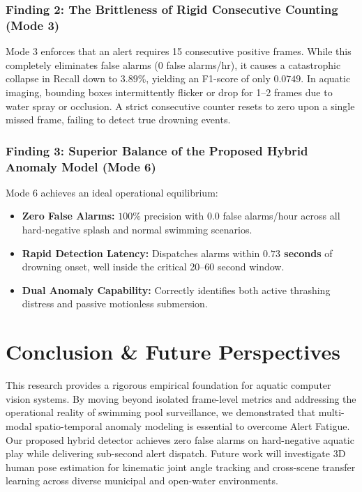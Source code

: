 \documentclass[a4paper,11pt]{article}
\begin{document}
\subsubsection{Finding 2: The Brittleness of Rigid Consecutive Counting (Mode 3)}
Mode 3 enforces that an alert requires 15 consecutive positive frames. While this completely eliminates false alarms (0 false alarms/hr), it causes a catastrophic collapse in Recall down to \textbf{$3.89\%$}, yielding an F1-score of only $0.0749$. In aquatic imaging, bounding boxes intermittently flicker or drop for 1--2 frames due to water spray or occlusion. A strict consecutive counter resets to zero upon a single missed frame, failing to detect true drowning events.

\subsubsection{Finding 3: Superior Balance of the Proposed Hybrid Anomaly Model (Mode 6)}
Mode 6 achieves an ideal operational equilibrium:
\begin{itemize}
    \item \textbf{Zero False Alarms:} $100\%$ precision with $0.0$ false alarms/hour across all hard-negative splash and normal swimming scenarios.
    \item \textbf{Rapid Detection Latency:} Dispatches alarms within \textbf{$0.73$ seconds} of drowning onset, well inside the critical 20--60 second window.
    \item \textbf{Dual Anomaly Capability:} Correctly identifies both active thrashing distress and passive motionless submersion.
\end{itemize}

\section{Conclusion \& Future Perspectives}
This research provides a rigorous empirical foundation for aquatic computer vision systems. By moving beyond isolated frame-level metrics and addressing the operational reality of swimming pool surveillance, we demonstrated that multi-modal spatio-temporal anomaly modeling is essential to overcome Alert Fatigue. Our proposed hybrid detector achieves zero false alarms on hard-negative aquatic play while delivering sub-second alert dispatch. Future work will investigate 3D human pose estimation for kinematic joint angle tracking and cross-scene transfer learning across diverse municipal and open-water environments.
\end{document}
